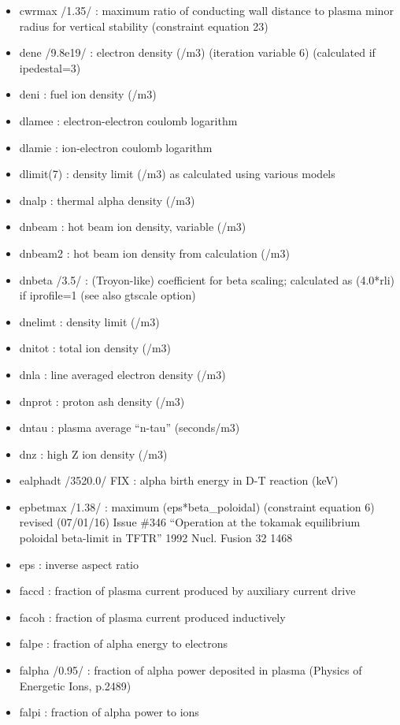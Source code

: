 \documentclass[]{article}
\begin{document}
\begin{itemize}
\item
  cwrmax /1.35/ : maximum ratio of conducting wall distance to plasma
  minor radius for vertical stability (constraint equation 23)
\item
  dene /9.8e19/ : electron density (/m3) (iteration variable 6)
  (calculated if ipedestal=3)
\item
  deni : fuel ion density (/m3)
\item
  dlamee : electron-electron coulomb logarithm
\item
  dlamie : ion-electron coulomb logarithm
\item
  dlimit(7) : density limit (/m3) as calculated using various models
\item
  dnalp : thermal alpha density (/m3)
\item
  dnbeam : hot beam ion density, variable (/m3)
\item
  dnbeam2 : hot beam ion density from calculation (/m3)
\item
  dnbeta /3.5/ : (Troyon-like) coefficient for beta scaling; calculated
  as (4.0*rli) if iprofile=1 (see also gtscale option)
\item
  dnelimt : density limit (/m3)
\item
  dnitot : total ion density (/m3)
\item
  dnla : line averaged electron density (/m3)
\item
  dnprot : proton ash density (/m3)
\item
  dntau : plasma average ``n-tau'' (seconds/m3)
\item
  dnz : high Z ion density (/m3)
\item
  ealphadt /3520.0/ FIX : alpha birth energy in D-T reaction (keV)
\item
  epbetmax /1.38/ : maximum (eps*beta\_poloidal) (constraint equation 6)
  revised (07/01/16) Issue \#346 ``Operation at the tokamak equilibrium
  poloidal beta-limit in TFTR'' 1992 Nucl. Fusion 32 1468
\item
  eps : inverse aspect ratio
\item
  faccd : fraction of plasma current produced by auxiliary current drive
\item
  facoh : fraction of plasma current produced inductively
\item
  falpe : fraction of alpha energy to electrons
\item
  falpha /0.95/ : fraction of alpha power deposited in plasma (Physics
  of Energetic Ions, p.2489)
\item
  falpi : fraction of alpha power to ions

\end{itemize}
\end{document}
